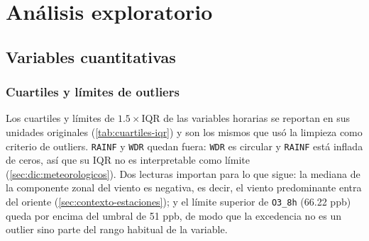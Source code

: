 \section{Análisis exploratorio}
\label{sec:eda}

\subsection{Variables cuantitativas}

\subsubsection{Cuartiles y límites de outliers}

Los cuartiles y límites de $1.5\times$IQR de las variables horarias se
reportan en sus unidades originales (\cref{tab:cuartiles-iqr}) y son los
mismos que usó la limpieza como criterio de outliers. \texttt{RAINF} y
\texttt{WDR} quedan fuera: \texttt{WDR} es circular y \texttt{RAINF} está
inflada de ceros, así que su IQR no es interpretable como límite
(\cref{sec:dic:meteorologicos}). Dos lecturas importan para lo que sigue: la
mediana de la componente zonal del viento es negativa, es decir, el viento
predominante entra del oriente (\cref{sec:contexto-estaciones}); y el límite
superior de \texttt{O3\_8h} (66.22 ppb) queda por encima del umbral de
51 ppb, de modo que la excedencia no es un outlier sino parte del rango
habitual de la variable.

